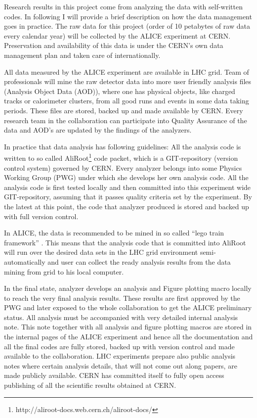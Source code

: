 Research results in this project come from analyzing the data with self-written codes. In following I will provide a brief description on how the data management goes in practice. 
The raw data for this project (order of 10 petabytes of raw data every calendar year) will be collected by the ALICE experiment at CERN. 
Preservation and availability of this data is under the CERN's own data management plan and taken care of internationally.

All data measured by the ALICE experiment are available in LHC grid. Team of professionals will mine the raw detector data into more user friendly analysis files (Analysis Object Data (AOD)), where one has physical objects, like charged tracks or calorimeter clusters, from all good runs and events in some data taking periods. These files are stored, backed up and made available by CERN. Every research team in the collaboration can participate into Quality Assurance of the data and AOD's are updated by the findings of the analyzers.

In practice that data analysis has following guidelines: All the analysis code is written to so called AliRoot\footnote{http://aliroot-docs.web.cern.ch/aliroot-docs/} code packet, which is a GIT-repository (version control system) governed by CERN. Every analyzer belongs into some Physics Working Group (PWG) under which she develops her own analysis code. All the analysis code is first tested locally and then committed into this experiment wide GIT-repository, assuming that it passes quality criteria set by the experiment. By the latest at this point, the code that analyzer produced is stored and backed up with full version control. 

In ALICE, the data is recommended to be mined in so called ``lego train framework'' \cite{Zimmermann:2015owa}. This means that the analysis code that is committed into AliRoot will run over the desired data sets in the LHC grid environment semi-automatically and user can collect the ready analysis results from the data mining from grid to his local computer.

In the final state, analyzer develops an analysis and Figure plotting macro locally to reach the very final analysis results. These results are first approved by the PWG and later exposed to the whole collaboration to get the ALICE preliminary status. All analysis must be accompanied with very detailed internal analysis note. This note together with all analysis and figure plotting macros are stored in the internal pages of the ALICE experiment and hence all the documentation and all the final codes are fully stored, backed up with version control and made available to the collaboration. LHC experiments prepare also public analysis notes where certain analysis details, that will not come out along papers, are made publicly available. CERN has committed itself to fully open access publishing of all the scientific results obtained at CERN.

\nopagebreak
